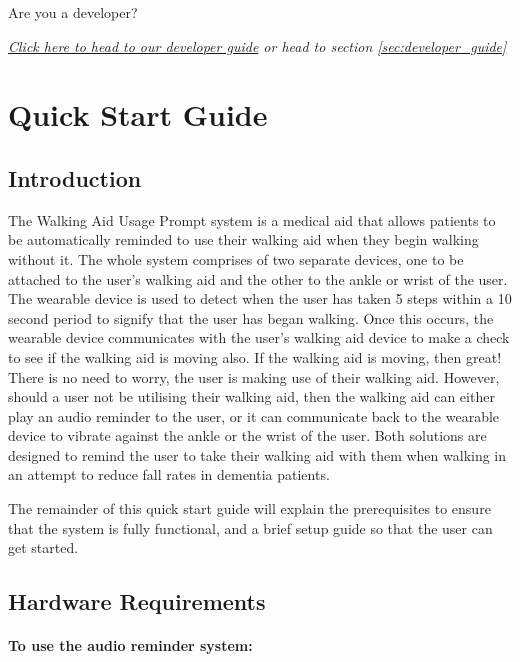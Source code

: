 		\vspace{1em}
		Are you a developer?

		\textit{\hyperref[sec:developer_guide]{Click here to head to our developer guide} or head to section \ref{sec:developer_guide}}

	\newpage
	\section{Quick Start Guide}
	\label{sec:quick_start_guide}

		\subsection{Introduction}
		\label{subsec:quick_start_guide_introduction}

			The Walking Aid Usage Prompt system is a medical aid that allows patients to be automatically reminded to use their walking aid when they begin walking without it. The whole system comprises of two separate devices, one to be attached to the user's walking aid and the other to the ankle or wrist of the user. The wearable device is used to detect when the user has taken 5 steps within a 10 second period to signify that the user has began walking. Once this occurs, the wearable device communicates with the user's walking aid device to make a check to see if the walking aid is moving also. If the walking aid is moving, then great! There is no need to worry, the user is making use of their walking aid. However, should a user not be utilising their walking aid, then the walking aid can either play an audio reminder to the user, or it can communicate back to the wearable device to vibrate against the ankle or the wrist of the user. Both solutions are designed to remind the user to take their walking aid with them when walking in an attempt to reduce fall rates in dementia patients.

			The remainder of this quick start guide will explain the prerequisites to ensure that the system is fully functional, and a brief setup guide so that the user can get started.

		\subsection{Hardware Requirements}
		\label{subsec:quick_start_guide_hardware}

			\paragraph{To use the audio reminder system:}\mbox{}

